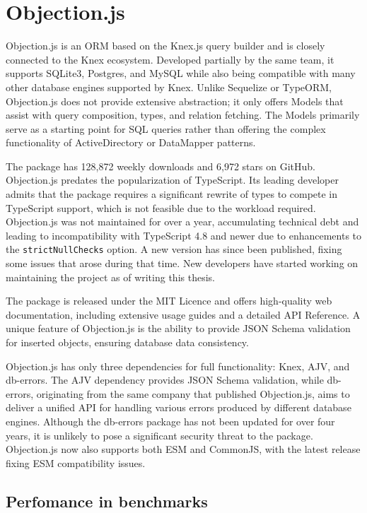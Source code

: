 \section{Objection.js}

Objection.js is an ORM based on the Knex.js query builder and is closely
connected to the Knex ecosystem. Developed partially by the same team, it
supports SQLite3, Postgres, and MySQL while also being compatible with many
other database engines supported by Knex. Unlike Sequelize or TypeORM,
Objection.js does not provide extensive abstraction; it only offers Models that
assist with query composition, types, and relation fetching. The Models
primarily serve as a starting point for SQL queries rather than offering the
complex functionality of ActiveDirectory or DataMapper patterns. 

The package has 128,872 weekly downloads and 6,972 stars on GitHub. Objection.js
predates the popularization of TypeScript. Its leading developer admits that the
package requires a significant rewrite of types to compete in TypeScript
support, which is not feasible due to the workload required. Objection.js was
not maintained for over a year, accumulating technical debt and leading to
incompatibility with TypeScript 4.8 and newer due to enhancements to the
\texttt{strictNullChecks} option. A new version has since been published, fixing
some issues that arose during that time. New developers have started working on
maintaining the project as of writing this thesis.

The package is released under the MIT Licence and offers high-quality web
documentation, including extensive usage guides and a detailed API Reference. A
unique feature of Objection.js is the ability to provide JSON Schema validation
for inserted objects, ensuring database data consistency.

Objection.js has only three dependencies for full functionality: Knex, AJV, and
db-errors. The AJV dependency provides JSON Schema validation, while db-errors,
originating from the same company that published Objection.js, aims to deliver a
unified API for handling various errors produced by different database engines.
Although the db-errors package has not been updated for over four years, it is
unlikely to pose a significant security threat to the package. Objection.js now
also supports both ESM and CommonJS, with the latest release fixing ESM
compatibility issues.

\subsection{Perfomance in benchmarks}

